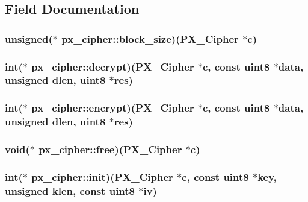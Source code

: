 \subsection{Field Documentation}
\hypertarget{structpx__cipher_ae07f901d28bee73ac010f9cf5e0b5542}{
\subsubsection[{block\-\_\-size}]{\setlength{\rightskip}{0pt plus 5cm}unsigned($\ast$ px\-\_\-cipher\-::block\-\_\-size)({\bf P\-X\-\_\-\-Cipher} $\ast$c)}}\label{structpx__cipher_ae07f901d28bee73ac010f9cf5e0b5542}
\hypertarget{structpx__cipher_a6d3313430da30c4bc1dd2759aa5828e1}{
\subsubsection[{decrypt}]{\setlength{\rightskip}{0pt plus 5cm}int($\ast$ px\-\_\-cipher\-::decrypt)({\bf P\-X\-\_\-\-Cipher} $\ast$c, const {\bf uint8} $\ast$data, unsigned dlen, {\bf uint8} $\ast$res)}}\label{structpx__cipher_a6d3313430da30c4bc1dd2759aa5828e1}
\hypertarget{structpx__cipher_a32ab97af8bda85fbf58ac89a33ca831f}{
\subsubsection[{encrypt}]{\setlength{\rightskip}{0pt plus 5cm}int($\ast$ px\-\_\-cipher\-::encrypt)({\bf P\-X\-\_\-\-Cipher} $\ast$c, const {\bf uint8} $\ast$data, unsigned dlen, {\bf uint8} $\ast$res)}}\label{structpx__cipher_a32ab97af8bda85fbf58ac89a33ca831f}
\hypertarget{structpx__cipher_a3de791a8214f3fbc31ed6dde380482ff}{
\subsubsection[{free}]{\setlength{\rightskip}{0pt plus 5cm}void($\ast$ px\-\_\-cipher\-::free)({\bf P\-X\-\_\-\-Cipher} $\ast$c)}}\label{structpx__cipher_a3de791a8214f3fbc31ed6dde380482ff}
\hypertarget{structpx__cipher_a4cc09030530e02a60c81374336ab8cc8}{
\subsubsection[{init}]{\setlength{\rightskip}{0pt plus 5cm}int($\ast$ px\-\_\-cipher\-::init)({\bf P\-X\-\_\-\-Cipher} $\ast$c, const {\bf uint8} $\ast$key, unsigned klen, const {\bf uint8} $\ast$iv)}}\label{structpx__cipher_a4cc09030530e02a60c81374336ab8cc8}
